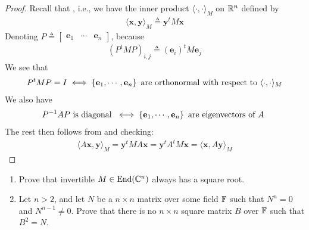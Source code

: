 \documentclass{report}
\begin{document}
\begin{proof}
Recall that , i.e., we have the inner product $\langle \cdot , \cdot \rangle _M$ on $\mathbb{R}^n$ defined by 
\begin{align*}
\langle \textbf{x},\textbf{y}\rangle _M \triangleq \textbf{y}^t M \textbf{x}
\end{align*}
Denoting $P\triangleq \begin{bmatrix}
  \textbf{e}_1 & \cdots & \textbf{e}_n
\end{bmatrix}$, because 
\begin{align*}
  (P^tMP)_{i,j}\triangleq (\textbf{e}_i)^t M \textbf{e}_j
\end{align*}
We see that 
\begin{align*}
P^tM P =I \iff \left\{ \textbf{e}_1, \cdots ,\textbf{e}_n \right\}\text{ are orthonormal with respect to }\langle \cdot, \cdot\rangle _M
\end{align*}
We also have 
\begin{align*}
P^{-1}AP \text{ is diagonal }\iff \left\{ \textbf{e}_1 ,\cdots ,\textbf{e}_n \right\}\text{ are eigenvectors of $A$ }
\end{align*}
The rest then follows from   and checking:
\begin{align*}
  \langle A\textbf{x},\textbf{y}\rangle_M = \textbf{y}^t M A \textbf{x} = \textbf{y}^tA^t M \textbf{x} = \langle \textbf{x},A\textbf{y}\rangle _M 
\end{align*}
\end{proof}
\begin{question}{}{}
\begin{enumerate}[label=(\alph*)]
  \item Prove that invertible $M \in \operatorname{End}(\mathbb{C}^n)$ always has a square root. 
  \item  Let $n>2$, and let $N$ be a  $n\times n$ matrix over some field $\mathbb{F}$ such that $N^n=0$ and $N^{n-1}\neq 0$. Prove that there is no $n\times n$ square matrix $B$ over $\mathbb{F}$  such that $B^2=N$. 
\end{enumerate}
\end{question}
\end{document}
